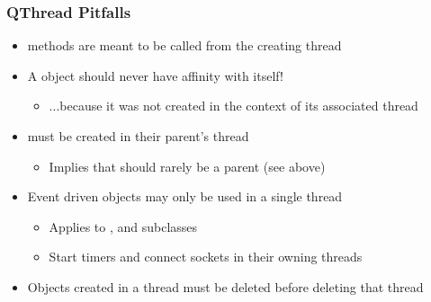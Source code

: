 \begin{slide}
\frametitle{QThread Pitfalls}

\begin{itemize}
\item {} methods are meant to be called from the creating thread
\item A  object should never have affinity with itself!
  \begin{itemize}
  \item ...because it was not created in the context of its associated thread
  \end{itemize}
\item {} must be created in their parent's thread
  \begin{itemize}
  \item Implies that  should rarely be a parent (see above)
  \end{itemize}
\item Event driven objects may only be used in a single thread
  \begin{itemize}
  \item Applies to , and  subclasses
  \item Start timers and connect sockets in their owning threads
  \end{itemize}
\item Objects created in a thread must be deleted before deleting that thread
\end{itemize}

\end{slide}

